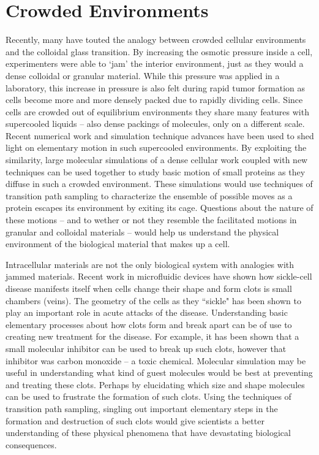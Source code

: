 \documentclass[11pt]{article}
\begin{document}
\section{Crowded Environments}
Recently, many have touted the analogy between crowded cellular environments and the colloidal glass transition.  By increasing the osmotic pressure inside a cell, experimenters were able to `jam' the interior environment, just as they would a dense colloidal or granular material.  While this pressure was applied in a laboratory, this increase in pressure is also felt during rapid tumor formation as cells become more and more densely packed due to rapidly dividing cells.  Since cells are crowded out of equilibrium environments they share many features with supercooled liquids -- also dense packings of molecules, only on a different scale.  Recent numerical work and simulation technique advances have been used to shed light on elementary motion in such supercooled environments.  By exploiting the similarity, large molecular simulations of a dense cellular work coupled with new techniques can be used together to  study basic motion of small proteins as they diffuse in such a crowded environment.  These simulations would use techniques of transition path sampling to characterize the ensemble of possible moves as a protein escapes its environment by exiting its cage.  Questions about the nature of these motions -- and to wether or not they resemble the facilitated motions in granular and colloidal materials -- would help us understand the physical environment of the biological material that makes up a cell. 

Intracellular materials are not the only biological system with analogies with jammed materials.  Recent work in microfluidic devices have shown how sickle-cell disease manifests itself when cells change their shape and form clots is small chambers (veins).  The geometry of the cells as they ``sickle" has been shown to play an important role in acute attacks of the disease.  Understanding basic elementary processes about how clots form and break apart can be of use to creating new treatment for the disease.  For example, it has been shown that a small molecular inhibitor can be used to break up such clots, however that inhibitor was carbon monoxide -- a toxic chemical.  Molecular simulation may be useful in understanding what kind of guest molecules would be best at preventing and treating these clots.  Perhaps by elucidating which size and shape molecules can be used to frustrate the formation of such clots.  Using the techniques of transition path sampling, singling out important elementary steps in the formation and destruction of such clots would give scientists a better understanding of these physical phenomena that have devastating biological consequences.
\end{document}
